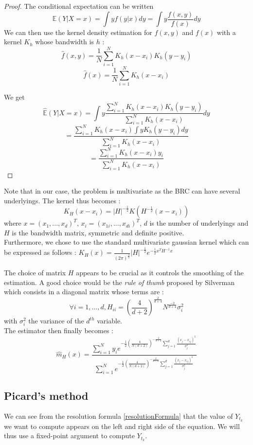 \documentclass[a4paper,11pt,english]{book}
\begin{document}
\begin{proof}
The conditional expectation can be written $$\mathbb{E}(Y|X=x)=\int yf(y|x)dy = \int y\frac{f(x,y)}{f(x)}dy$$
We can then use the kernel density estimation for $f(x,y)$ and $f(x)$ with a kernel $K_{h}$ whose bandwidth is $h$ : $$\hat{f}(x,y) = \frac{1}{N}\sum_{i=1}^{N}K_{h}(x-x_{i})K_{h}(y-y_{i})$$
$$\hat{f}(x) = \frac{1}{N}\sum_{i=1}^{N}K_{h}(x-x_{i})$$

We get $$\hat{\mathbb{E}}(Y|X=x) = \int y\frac{\sum_{i=1}^{N}K_{h}(x-x_{i})K_{h}(y-y_{i})}{\sum_{i=1}^{N}K_{h}(x-x_{i})}dy$$
$$=\frac{\sum_{i=1}^{N}K_{h}(x-x_{i})\int y K_{h}(y-y_{i})dy }{\sum_{i=1}^{N}K_{h}(x-x_{i})}$$
$$=\frac{\sum_{i=1}^{N}K_{h}(x-x_{i})y_{i}}{\sum_{i=1}^{N}K_{h}(x-x_{i})}$$
\end{proof}

Note that in our case, the problem is multivariate as the BRC can have several underlyings. The kernel thus becomes : $$K_{H}(x-x_{i}) = |H|^{-\frac{1}{2}}K(H^{-\frac{1}{2}}(x-x_{i}))$$
where $x=(x_{1},...,x_{d})^{T}$, $x_{i}=(x_{1i},...,x_{di})^{T}$, $d$ is the number of underlyings and $H$ is the bandwidth matrix, symmetric and definite positive.\\

Furthermore, we chose to use the standard multivariate gaussian kernel which can be expressed as follows :
$K_{H}(x)=\frac{1}{(2\pi)^{\frac{d}{2}}}|H|^{-\frac{1}{2}}e^{-\frac{1}{2}x^{T}H^{-1}x}$

The choice of matrix $H$ appears to be crucial as it controls the smoothing of the estimation. A good choice would be the \textit{rule of thumb} proposed by Silverman\cite{silverman1986density} which consists in a diagonal matrix whose terms are : $$\forall i=1,...,d, H_{ii} = (\frac{4}{d+2})^{\frac{2}{d+4}}N^{\frac{-2}{d+4}}\sigma_{i}^{2}$$
with $\sigma_{i}^{2}$ the variance of the $d^{th}$ variable.\\

The estimator then finally becomes :
$$\hat{m}_{H}(x)= \frac{\sum_{i=1}^{N}y_{i}e^{-\frac{1}{2}(\frac{4}{N(d+2)})^{-\frac{2}{d+4}}\sum_{j=1}^{d}\frac{(x_{j}-x_{ij})^{2}}{\sigma_{j}^{2}}}}{\sum_{i=1}^{N}e^{-\frac{1}{2}(\frac{4}{N(d+2)})^{-\frac{2}{d+4}}\sum_{j=1}^{d}\frac{(x_{j}-x_{ij})^{2}}{\sigma_{j}^{2}}}}$$
\subsection{Picard's method}
We can see from the resolution formula \eqref{resolutionFormula} that the value of $Y_{t_{k}}$ we want to compute appears on the left and right side of the equation. We will thus use a fixed-point argument to compute $Y_{t_{k}}$.
\end{document}
